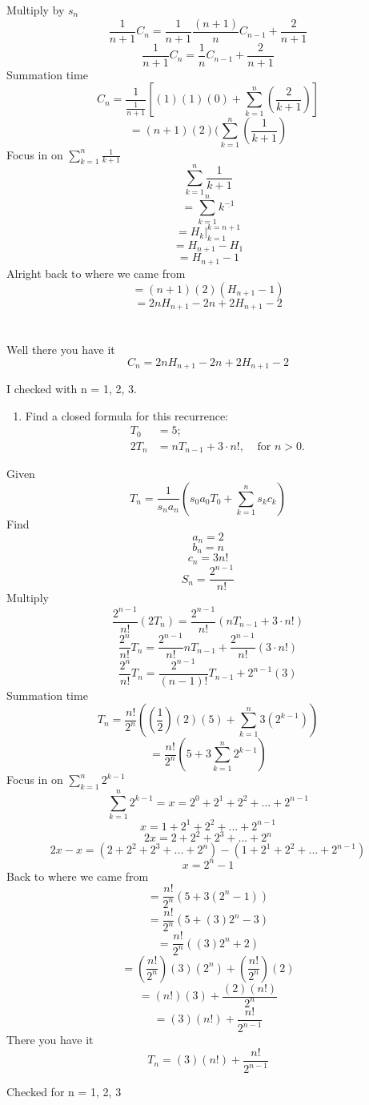 \documentclass[10pt, AMS Euler]{article}
\begin{document}
            Multiply by $s_n$
                $$ \frac{1}{n+1}C_n = \frac{1}{n+1} \frac{(n + 1)}{n} C_{n-1} + \frac{2}{n+1} $$
                $$ \frac{1}{n+1}C_n = \frac{1}{n} C_{n-1} + \frac{2}{n+1} $$
            Summation time
                $$ C_n = \frac{1}{\frac{1}{n+1}} [(1)(1)(0) + \sum_{k=1}^n( \frac{2}{k+1})]$$
                $$ = (n+1) (2)(\sum_{k=1}^n( \frac{1}{k+1} )$$
            Focus in on $\sum_{k=1}^n \frac{1}{k+1} $
                $$\sum_{k=1}^n \frac{1}{k+1} $$
                $$ = \sum_{k=1}^n k^{\underline{-1}}$$
                $$ = \left .H_k\right|_{k=1}^{k=n+1}$$
                $$ = H_{n+1} - H_1 $$
                $$ = H_{n+1} - 1 $$
            Alright back to where we came from
                $$ = (n+1)(2)(H_{n+1} - 1) $$
                $$ = 2nH_{n+1} - 2n + 2H_{n+1} - 2 $$
            \\
            \\
            Well there you have it
                $$ C_n = 2nH_{n+1} - 2n + 2H_{n+1} - 2 $$

            I checked with n = 1, 2, 3.
            

        \newpage
        \begin{enumerate}[resume]
		\item Find a closed formula for this recurrence:
		\begin{align*} T_0 &= 5;\\ 2T_n &= nT_{n-1} +3 \cdot n!, \;\;\;\; \mbox{for $n>0$.}\end{align*}
	\end{enumerate}
            Given
                $$ T_n = \frac{1}{s_n a_n} (s_0 a_0 T_0 + \sum_{k=1}^n s_k c_k)$$
	    Find
                $$ a_n = 2 $$
                $$ b_n = n $$
                $$ c_n = 3n! $$
                $$ S_n = \frac{2^{n-1}}{n!} $$
            Multiply
                $$ \frac{2^{n-1}}{n!} (2T_n) = \frac{2^{n-1}}{n!} (nT_{n-1} +3 \cdot n!) $$
                $$ \frac{2^n}{n!} T_n = \frac{2^{n-1}}{n!} nT_{n-1} + \frac{2^{n-1}}{n!} (3 \cdot n!) $$
                $$ \frac{2^n}{n!} T_n = \frac{2^{n-1}}{(n-1)!} T_{n-1} + 2^{n-1}(3)  $$
            Summation time
                $$ T_n = \frac{n!}{2^n} ((\frac{1}{2})(2)(5) + \sum_{k=1}^n 3(2^{k-1})) $$
                $$ = \frac{n!}{2^n} (5 + 3 \sum_{k=1}^n 2^{k-1} ) $$
            Focus in on $\sum_{k=1}^n 2^{k-1} $
                $$\sum_{k=1}^n 2^{k-1} = x = 2^0 + 2^1 + 2^2 + ... + 2^{n-1}$$
                $$ x = 1 + 2^1 + 2^2 + ... + 2^{n-1} $$
                $$ 2 x = 2 + 2^2 + 2^3 + ... + 2^n $$
                $$ 2 x - x = (2 + 2^2 + 2^3 + ... + 2^n) - (1 + 2^1 + 2^2 + ... + 2^{n-1}) $$
                $$ x = 2^n - 1 $$
            Back to where we came from 
                $$ = \frac{n!}{2^n} (5 + 3 (2^n - 1 )) $$
                $$ = \frac{n!}{2^n} (5 +  (3) 2^n - 3 ) $$
                $$ = \frac{n!}{2^n} ((3) 2^n + 2 ) $$
                $$ = (\frac{n!}{2^n})(3)(2^n) + (\frac{n!}{2^n})(2) $$
                $$ = (n!)(3) + \frac{(2)(n!)}{2^n} $$
                $$ = (3)(n!) + \frac{n!}{2^{n-1}} $$
            There you have it
                $$ T_n = (3)(n!) + \frac{n!}{2^{n-1}} $$

            Checked for n = 1, 2, 3
	
	\noindent \underline{\hspace{3in}}\\
	
	
	
	
\end{document}
